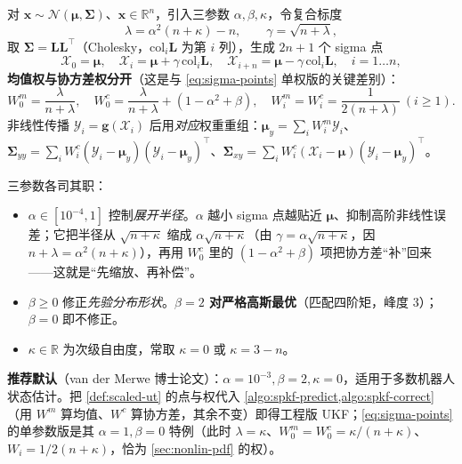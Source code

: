 \begin{definition}\label{def:scaled-ut}
对 $\mathbf{x}\sim\mathcal{N}(\boldsymbol{\mu},\boldsymbol{\Sigma})$、$\mathbf{x}\in\mathbb{R}^n$，引入三参数 $\alpha,\beta,\kappa$，令复合标度
\begin{equation}
  \lambda=\alpha^2(n+\kappa)-n,\qquad \gamma=\sqrt{n+\lambda},
  \label{eq:sut-lambda}
\end{equation}
取 $\boldsymbol{\Sigma}=\mathbf{L}\mathbf{L}^\top$（Cholesky，$\mathrm{col}_i\mathbf{L}$ 为第 $i$ 列），生成 $2n+1$ 个 sigma 点
\begin{equation}
  \boldsymbol{\mathcal{X}}_0=\boldsymbol{\mu},\quad
  \boldsymbol{\mathcal{X}}_i=\boldsymbol{\mu}+\gamma\,\mathrm{col}_i\mathbf{L},\quad
  \boldsymbol{\mathcal{X}}_{i+n}=\boldsymbol{\mu}-\gamma\,\mathrm{col}_i\mathbf{L},\quad i=1\dots n,
  \label{eq:sut-points}
\end{equation}
\textbf{均值权与协方差权分开}（这是与 \cref{eq:sigma-points} 单权版的关键差别）：
\begin{equation}
  W_0^m=\frac{\lambda}{n+\lambda},\quad
  W_0^c=\frac{\lambda}{n+\lambda}+(1-\alpha^2+\beta),\quad
  W_i^m=W_i^c=\frac{1}{2(n+\lambda)}\ (i\ge1).
  \label{eq:sut-weights}
\end{equation}
非线性传播 $\boldsymbol{\mathcal{Y}}_i=\mathbf{g}(\boldsymbol{\mathcal{X}}_i)$ 后用\emph{对应}权重重组：$\boldsymbol{\mu}_y=\sum_i W_i^m\boldsymbol{\mathcal{Y}}_i$、$\boldsymbol{\Sigma}_{yy}=\sum_i W_i^c(\boldsymbol{\mathcal{Y}}_i-\boldsymbol{\mu}_y)(\boldsymbol{\mathcal{Y}}_i-\boldsymbol{\mu}_y)^\top$、$\boldsymbol{\Sigma}_{xy}=\sum_i W_i^c(\boldsymbol{\mathcal{X}}_i-\boldsymbol{\mu})(\boldsymbol{\mathcal{Y}}_i-\boldsymbol{\mu}_y)^\top$。
\end{definition}

\noindent 三参数各司其职\cite{julier2002scaled,vandermerwe2004sigma}：
\begin{itemize}
  \item $\alpha\in[10^{-4},1]$ 控制\emph{展开半径}。$\alpha$ 越小 sigma 点越贴近 $\boldsymbol{\mu}$、抑制高阶非线性误差；它把半径从 $\sqrt{n+\kappa}$ 缩成 $\alpha\sqrt{n+\kappa}$（由 $\gamma=\alpha\sqrt{n+\kappa}$，因 $n+\lambda=\alpha^2(n+\kappa)$），再用 $W_0^c$ 里的 $(1-\alpha^2+\beta)$ 项把协方差“补”回来——这就是“先缩放、再补偿”。
  \item $\beta\ge0$ 修正\emph{先验分布形状}。\textbf{$\beta=2$ 对严格高斯最优}（匹配四阶矩，峰度 $3$）；$\beta=0$ 即不修正。
  \item $\kappa\in\mathbb{R}$ 为次级自由度，常取 $\kappa=0$ 或 $\kappa=3-n$。
\end{itemize}
\textbf{推荐默认}（van der Merwe 博士论文\cite{vandermerwe2004sigma}）：$\alpha=10^{-3},\beta=2,\kappa=0$，适用于多数机器人状态估计。把 \cref{def:scaled-ut} 的点与权代入 \cref{algo:spkf-predict,algo:spkf-correct}（用 $W^m$ 算均值、$W^c$ 算协方差，其余不变）即得工程版 UKF；\cref{eq:sigma-points} 的单参数版是其 $\alpha=1,\beta=0$ 特例（此时 $\lambda=\kappa$、$W_0^m=W_0^c=\kappa/(n+\kappa)$、$W_i=1/2(n+\kappa)$，恰为 \cref{sec:nonlin-pdf} 的权）。

